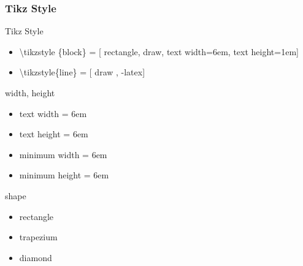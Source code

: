 \documentclass[ aspectratio=169,  10pt,blue,xcolor=pdftex,dvipsnames,table,handout,notes]{beamer}
\begin{document}
		\begin{frame}[plain]

			\centering
			\scalebox{4}{영역 색깔로 채우기}
	
		\note[item]{ }
		\end{frame}













		\begin{frame}[t]
		\frametitle{Tikz Style}

			\begin{block}{Tikz Style}
			\begin{itemize}
			\item[] 	\textbackslash tikzstyle \{block\} = [ rectangle, draw, text width=6em, text height=1em]
			\item[] 	\textbackslash tikzstyle\{line\} = [ draw , -latex]
			\end{itemize}
			\end{block}


			\begin{block}{width, height}
			\begin{itemize}
			\item[] 	text width = 6em
			\item[] 	text height = 6em
			\item[] 	minimum width = 6em
			\item[] 	minimum height = 6em
			\end{itemize}
			\end{block}

			\begin{block}{shape}
			\begin{itemize}
			\item[] 	rectangle
			\item[] 	trapezium
			\item[] 	diamond
			\end{itemize}
			\end{block}


		\note[item]{}
		\end{frame}
\end{document}
